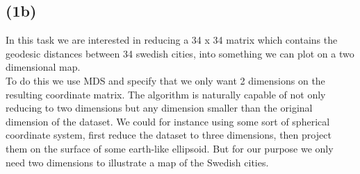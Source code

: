 \documentclass[12pt, letterpaper]{article}
\begin{document}
    \subsection*{(1b)}
      In this task we are interested in reducing a 34 x 34 matrix which contains the geodesic distances between 34 swedish cities, into something we can plot on a two dimensional map.\\
      To do this we use MDS and specify that we only want 2 dimensions on the resulting coordinate matrix. The algorithm is naturally capable of not only reducing to two dimensions but any dimension smaller than the original dimension of the dataset. We could for instance using some sort of spherical coordinate system, first reduce the dataset to three dimensions, then project them on the surface of some earth-like ellipsoid. But for our purpose we only need two dimensions to illustrate a map of the Swedish cities.\\
\end{document}
